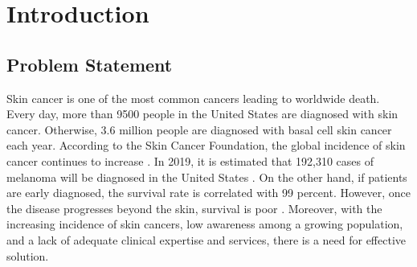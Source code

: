 \documentclass[sensors,article,submit,pdftex,moreauthors]{Definitions/mdpi}
\begin{document}
\setcounter{section}{0} %

\section{Introduction} 
\subsection{Problem Statement}
Skin cancer is one of the most common cancers leading to worldwide death. Every day, more than 9500 \cite{03358} people in the United States are diagnosed with skin cancer. Otherwise, 3.6 \cite{03358} million people are diagnosed with basal cell skin cancer each year. According to the Skin Cancer Foundation, the global incidence of skin cancer continues to increase \cite{11872}. In 2019, it is estimated that 192,310 cases of melanoma will be diagnosed in the United States \cite{11872}. On the other hand, if patients are early diagnosed, the survival rate is correlated with 99 percent. However, once the disease progresses beyond the skin, survival is poor \cite{11872}. Moreover, with the increasing incidence of skin cancers, low awareness among a growing population, and a lack of adequate clinical expertise and services, there is a need for effective solution. 
\end{document}
